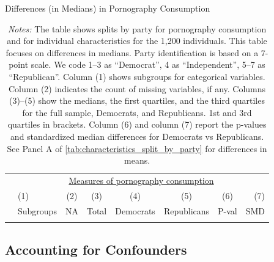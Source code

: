 \documentclass[12pt, letterpaper]{article}
\begin{document}
\begin{table}[ht] \centering \small \setlength\tabcolsep{5 pt}
	\caption{Differences (in Medians) in Pornography Consumption}
	\label{tab:characteristics_split_by_party_medians}
	\begin{adjustbox}{max width=\textwidth}
		\begin{tabular}{@{\hspace{0\tabcolsep}}llrcccrr@{\hspace{0\tabcolsep}}}
			\toprule
			&\multicolumn{7}{c}{\underline{Measures of pornography consumption}}\\
			&\multicolumn{1}{l}{(1)}&\multicolumn{1}{c}{(2)}&\multicolumn{1}{c}{(3)}&\multicolumn{1}{c}{(4)}&\multicolumn{1}{c}{(5)}&\multicolumn{1}{c}{(6)}&\multicolumn{1}{r}{(7)}\\			
			&\multicolumn{1}{l}{Subgroups}&\multicolumn{1}{c}{NA}&\multicolumn{1}{c}{Total}&\multicolumn{1}{c}{Democrats}&\multicolumn{1}{c}{Republicans}&\multicolumn{1}{c}{P-val}&\multicolumn{1}{r}{SMD}\\
			\cmidrule{2-8}
			\\
			\bottomrule
		\end{tabular}
	\end{adjustbox}
	\caption*{\scriptsize \emph{Notes:}
		The table shows splits by party for pornography consumption and for individual characteristics for the 1,200 individuals.
		This table focuses on differences in medians.
		Party identification is based on a 7-point scale. We code 1--3 as ``Democrat'', 4 as ``Independent'', 5--7 as ``Republican''.
		Column (1) shows subgroups for categorical variables.
		Column (2) indicates the count of missing variables, if any.
		Columns (3)--(5) show the medians, the first quartiles, and the third quartiles for the full sample, Democrats, and Republicans.
		1st and 3rd quartiles in brackets.
		Column (6) and column (7) report the p-values and standardized median differences for Democrats vs Republicans.
		See Panel A of \cref{tab:characteristics_split_by_party} for differences in means.
	}
\end{table}
\FloatBarrier
\clearpage
\subsection{Accounting for Confounders}
\end{document}

